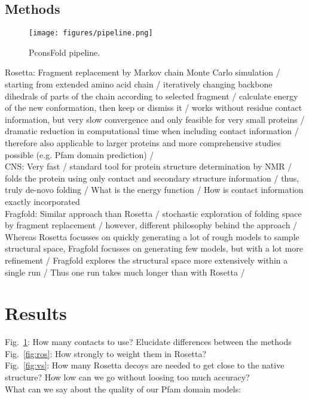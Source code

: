 \documentclass{bioinfo}
\begin{document}
\begin{methods}
\section{Methods}
\begin{figure}[!tpb]%
    \centerline{\texttt{[image: figures/pipeline.png]}}
\caption{PconsFold pipeline.}\label{fig:main}
\end{figure}
Rosetta: Fragment replacement by Markov chain Monte Carlo simulation / starting from extended amino acid chain / iteratively changing backbone dihedrals of parts of the chain according to selected fragment / calculate energy of the new conformation, then keep or dismiss it / works without residue contact information, but very slow convergence and only feasible for very small proteins / dramatic reduction in computational time when including contact information / therefore also applicable to larger proteins and more comprehensive studies possible (e.g. Pfam domain prediction) / \\
CNS: Very fast / standard tool for protein structure determination by NMR / folds the protein using only contact and secondary structure information / thus, truly de-novo folding / What is the energy function / How is contact information exactly incorporated \\
Fragfold: Similar approach than Rosetta / stochastic exploration of folding space by fragment replacement / however, different philosophy behind the approach / Whereas Rosetta focusses on quickly generating a lot of rough models to sample structural space, Fragfold focusses on generating few models, but with a lot more refinement / Fragfold explores the structural space more extensively within a single run / Thus one run takes much longer than with Rosetta / 


\end{methods}
\section{Results}
Fig.\ \ref{fig:main}: How many contacts to use? Elucidate differences between the methods \\
Fig.\ \ref{fig:ros}: How strongly to weight them in Rosetta? \\
Fig.\ \ref{fig:vs}: How many Rosetta decoys are needed to get close to the native structure? How low can we go without loosing too much accuracy? \\
What can we say about the quality of our Pfam domain models: \\
\end{document}
